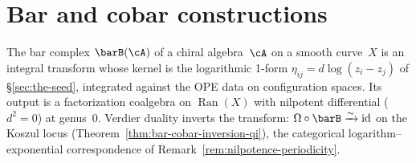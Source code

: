 \chapter{Bar and cobar constructions}
\label{chap:bar-cobar}



The bar complex $\barB(\cA)$ of a chiral algebra~$\cA$ on a smooth
curve~$X$ is an integral transform whose kernel is the logarithmic
1-form $\eta_{ij} = d\log(z_i - z_j)$ of \S\ref{sec:the-seed},
integrated against the OPE data on configuration spaces.  Its output
is a factorization coalgebra on $\operatorname{Ran}(X)$ with nilpotent
differential ($d^2 = 0$) at genus~$0$.  Verdier duality inverts the
transform: $\Omega \circ \barB \xrightarrow{\sim} \mathrm{id}$ on the
Koszul locus (Theorem~\ref{thm:bar-cobar-inversion-qi}), the
categorical logarithm--exponential correspondence of
Remark~\ref{rem:nilpotence-periodicity}.

